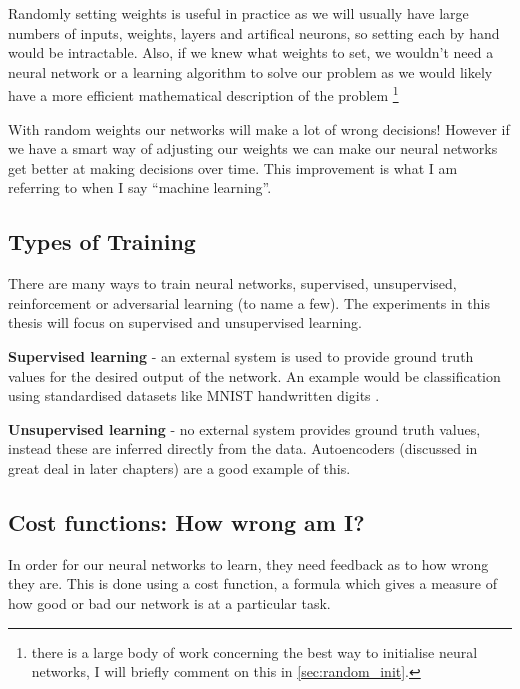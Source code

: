 Randomly setting weights is useful in practice as we will usually have large numbers of inputs, weights, layers and artifical neurons, so setting each by hand would be intractable. Also, if we knew what weights to set, we wouldn't need a neural network or a learning algorithm to solve our problem as we would likely have a more efficient mathematical description of the problem \footnote{there is a large body of work concerning the best way to initialise neural networks, I will briefly comment on this in \autoref{sec:random_init}.} 

With random weights our networks will make a lot of wrong decisions! However if we have a smart way of adjusting our weights we can make our neural networks get better at making decisions over time. This improvement is what I am referring to when I say ``machine learning''.

\subsection{Types of Training}
There are many ways to train neural networks, supervised, unsupervised, reinforcement or 
adversarial learning (to name a few). The experiments in this thesis will focus on supervised and unsupervised learning. %


\textbf{Supervised learning} - an external system is used to provide ground truth values for the desired output of the network. An example would be classification using standardised datasets like MNIST handwritten digits \cite{lecun1998mnist}.


\textbf{Unsupervised learning} - no external system provides ground truth values, instead these are inferred directly from the data. Autoencoders (discussed in great deal in later chapters) are a good example of this.  




\subsection{Cost functions: How wrong am I?}
In order for our neural networks to learn, they need feedback as to how wrong they are. This is done using a cost function, a formula which gives a measure of how good or bad our network is at a particular task.

